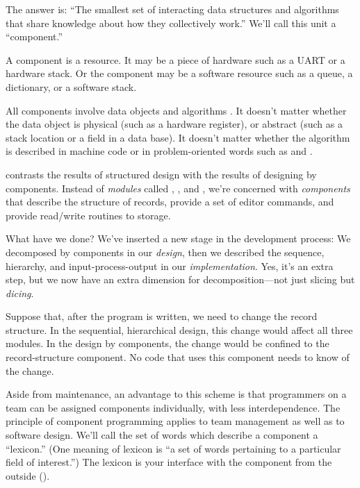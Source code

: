 The answer is: ``The smallest set of interacting data structures and
algorithms
that share knowledge about how they collectively work.'' We'll call
this unit a ``component.''

A component is a resource. It may be a piece of hardware such as a
UART or a hardware stack. Or the component may be a software resource
such as a queue, a dictionary, or a software stack.

All components involve data objects and algorithms%
.
It doesn't matter whether the data object is physical (such as a
hardware register), or abstract (such as a stack location or a field
in a data base).  It doesn't matter whether the algorithm is described
in machine code or in problem-oriented words such as 
and .

%
 contrasts the results of structured design with the
results of designing by components. Instead of \emph{modules} called
, , and ,
we're concerned with \emph{components} that describe the structure of
records, provide a set of editor commands, and provide read/write
routines to storage.

What have we done? We've inserted a new stage in the development
process: We decomposed by components in our \emph{design}, then we
described the sequence, hierarchy, and input-process-output in our
\emph{implementation}.  Yes, it's an extra step, but we now have an
extra dimension for decomposition---not just slicing but
\emph{dicing}.

Suppose that, after the program is written, we need to change the
record structure. In the sequential, hierarchical design, this change
would affect all three modules. In the design by components, the
change would be confined to the record-structure component. No code
that uses this component needs to know of the change.

Aside from maintenance, an advantage to this scheme is that
programmers on a team can be assigned components individually, with
less interdependence.  The principle of component programming applies
to team management as well as to software design.%
%
%
%
We'll call the set of words which describe a component a ``lexicon.''
(One meaning of lexicon is ``a set of words pertaining to a particular
field of interest.'') The lexicon is your interface with the component
from the outside ().

